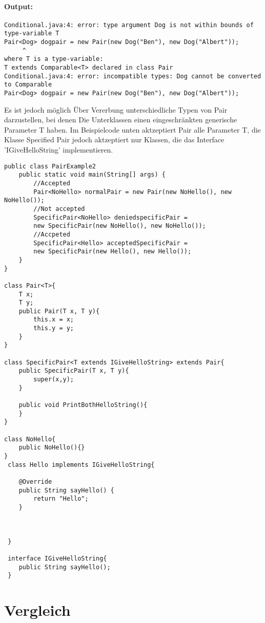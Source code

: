 \documentclass[a4paper, 1ppt]{article}
\begin{document}
\paragraph{Output:}
\begin{verbatim}
Conditional.java:4: error: type argument Dog is not within bounds of type-variable T
Pair<Dog> dogpair = new Pair(new Dog("Ben"), new Dog("Albert"));
	 ^
where T is a type-variable:
T extends Comparable<T> declared in class Pair
Conditional.java:4: error: incompatible types: Dog cannot be converted to Comparable
Pair<Dog> dogpair = new Pair(new Dog("Ben"), new Dog("Albert"));
\end{verbatim}
Es ist jedoch möglich Über Vererbung unterschiedliche Typen von Pair darzustellen, bei denen Die Unterklassen einen eingeschränkten generische Parameter T haben. Im Beispielcode unten aktzeptiert Pair alle Parameter T, die Klasse Specified Pair jedoch aktzeptiert nur Klassen, die das Interface 'IGiveHelloString' implementieren.
\begin{verbatim}
public class PairExample2
    public static void main(String[] args) {
		//Accepted
        Pair<NoHello> normalPair = new Pair(new NoHello(), new NoHello());
        //Not accepted
        SpecificPair<NoHello> deniedspecificPair =
		new SpecificPair(new NoHello(), new NoHello());
        //Accpeted
        SpecificPair<Hello> acceptedSpecificPair =
		new SpecificPair(new Hello(), new Hello());
    }
}

class Pair<T>{
    T x;
    T y;
    public Pair(T x, T y){
        this.x = x;
        this.y = y;
    }
}

class SpecificPair<T extends IGiveHelloString> extends Pair{
    public SpecificPair(T x, T y){
        super(x,y);
    }

    public void PrintBothHelloString(){
    }
}

class NoHello{
    public NoHello(){}
}
 class Hello implements IGiveHelloString{

    @Override
    public String sayHello() {
        return "Hello";
    }

   

 }

 interface IGiveHelloString{
    public String sayHello();
 }
\end{verbatim}
\newpage
\section{Vergleich}
\end{document}
